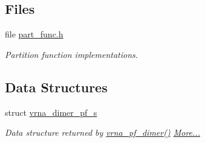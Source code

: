 \subsection*{Files}
\begin{DoxyCompactItemize}
\item 
file \hyperlink{part__func_8h}{part\+\_\+func.\+h}
\begin{DoxyCompactList}\small\item\em Partition function implementations. \end{DoxyCompactList}\end{DoxyCompactItemize}
\subsection*{Data Structures}
\begin{DoxyCompactItemize}
\item 
struct \hyperlink{group__part__func__global_structvrna__dimer__pf__s}{vrna\+\_\+dimer\+\_\+pf\+\_\+s}
\begin{DoxyCompactList}\small\item\em Data structure returned by \hyperlink{group__part__func__global_ga4e5c7d06c302a7c59fc0d64dc142ca63}{vrna\+\_\+pf\+\_\+dimer()}  \hyperlink{group__part__func__global_structvrna__dimer__pf__s}{More...}\end{DoxyCompactList}\end{DoxyCompactItemize}
